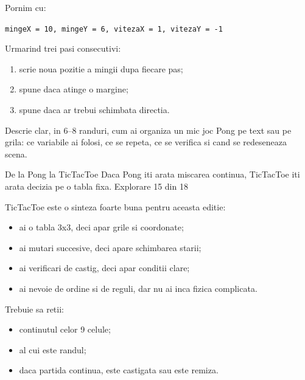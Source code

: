 \begin{semibox}
Pornim cu:
\begin{center}
\texttt{mingeX = 10, mingeY = 6, vitezaX = 1, vitezaY = -1}
\end{center}
Urmarind trei pasi consecutivi:
\begin{enumerate}
\item scrie noua pozitie a mingii dupa fiecare pas;
\item spune daca atinge o margine;
\item spune daca ar trebui schimbata directia.
\end{enumerate}
\end{semibox}

\begin{solobox}
Descrie clar, in 6--8 randuri, cum ai organiza un mic joc Pong pe text sau pe grila: ce variabile ai folosi, ce se repeta, ce se verifica si cand se redeseneaza scena.
\end{solobox}

\clearpage

\PageHeader
  {De la Pong la TicTacToe}
  {Daca Pong iti arata miscarea continua, TicTacToe iti arata decizia pe o tabla fixa.}
  {Explorare 15 din 18}

\begin{missionbox}
TicTacToe este o sinteza foarte buna pentru aceasta editie:
\begin{itemize}
\item ai o tabla 3x3, deci apar grile si coordonate;
\item ai mutari succesive, deci apare schimbarea starii;
\item ai verificari de castig, deci apar conditii clare;
\item ai nevoie de ordine si de reguli, dar nu ai inca fizica complicata.
\end{itemize}
\end{missionbox}

\begin{conceptbox}
Trebuie sa retii:
\begin{itemize}
\item continutul celor 9 celule;
\item al cui este randul;
\item daca partida continua, este castigata sau este remiza.
\end{itemize}
\end{conceptbox}

